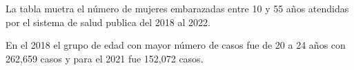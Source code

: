 La tabla muetra el número de mujeres embarazadas entre 10 y 55 años atendidas por el sistema de salud publica del 2018 al 2022. 

En el 2018 el grupo de edad con mayor número de casos fue de 20 a 24 años con 262,659 casos y para el 2021 fue 152,072 casos. 


